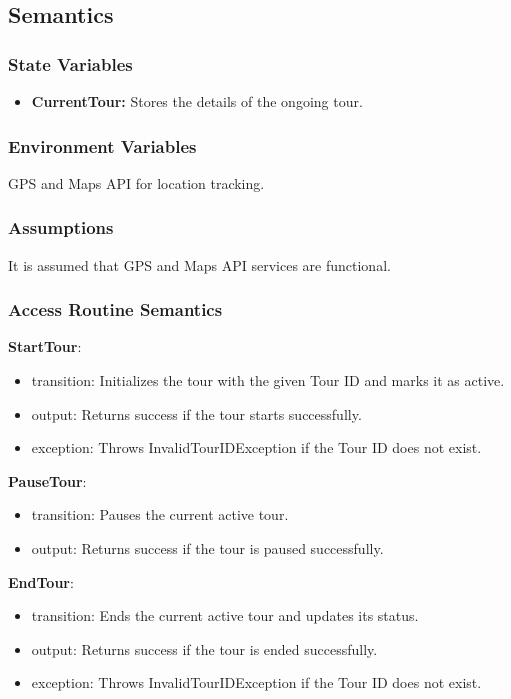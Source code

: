 \documentclass[12pt, titlepage]{article}
\begin{document}
\subsection{Semantics}

\subsubsection{State Variables}

\begin{itemize}
  \item \textbf{CurrentTour:} Stores the details of the ongoing tour.
\end{itemize}

\subsubsection{Environment Variables}

GPS and Maps API for location tracking.

\subsubsection{Assumptions}

It is assumed that GPS and Maps API services are functional.

\subsubsection{Access Routine Semantics}

\noindent \textbf{StartTour}:
\begin{itemize}
  \item transition: Initializes the tour with the given Tour ID and marks it as active.
  \item output: Returns success if the tour starts successfully.
  \item exception: Throws InvalidTourIDException if the Tour ID does not exist.
\end{itemize}

\noindent \textbf{PauseTour}:
\begin{itemize}
  \item transition: Pauses the current active tour.
  \item output: Returns success if the tour is paused successfully.
\end{itemize}

\noindent \textbf{EndTour}:
\begin{itemize}
  \item transition: Ends the current active tour and updates its status.
  \item output: Returns success if the tour is ended successfully.
  \item exception: Throws InvalidTourIDException if the Tour ID does not exist.
\end{itemize}
\end{document}
